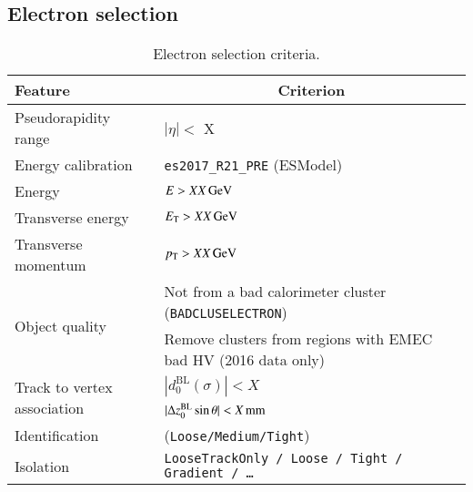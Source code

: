 \subsection{Electron selection}

\begin{table}[ht]
  \caption{Electron selection criteria.}%
  \label{tab:object:electron}
  \centering
  \begin{tabular}{ll}
    \toprule
    Feature & \multicolumn{1}{c}{Criterion} \\
    \midrule
    Pseudorapidity range & \(|\eta| <\) X\\
    Energy calibration & \texttt{es2017\_R21\_PRE} (ESModel)\\
    Energy & \(E > \qty[parse-numbers=false]{XX}{\GeV}\) \\
    Transverse energy & \(\ET > \qty[parse-numbers=false]{XX}{\GeV}\) \\
    Transverse momentum & \(\pT > \qty[parse-numbers=false]{XX}{\GeV}\) \\
    \midrule
    \multirow{2}{*}{Object quality} & Not from a bad calorimeter cluster (\texttt{BADCLUSELECTRON})\\ %
      & Remove clusters from regions with EMEC bad HV (2016 data only) \\
    \midrule
    \multirow{2}{*}{Track to vertex association} & \(|d_{0}^{\text{BL}}(\sigma)| < X\) \\ %
    & \(|\Delta z_{0}^{\text{BL}} \sin{\theta}| < \qty[parse-numbers=false]{X}{\mm}\) \\
    \midrule
    Identification & (\texttt{Loose/Medium/Tight}) \\
    Isolation & \texttt{LooseTrackOnly / Loose / Tight / Gradient / \ldots} \\
      \bottomrule
  \end{tabular}
\end{table}

